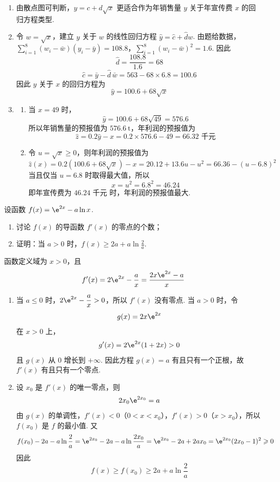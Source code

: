 \begin{solution}
\begin{enumerate}
\item 由散点图可判断，\(y=c+d\sqrt{x}\) 更适合作为年销售量 \(y\) 关于年宣传费 \(x\) 的回归方程类型.

\item 令 \(w=\sqrt{x}\)，建立 \(y\) 关于 \(w\) 的线性回归方程 \(\hat y=\hat c+\hat d w\). 由题给数据，
\(\sum_{i=1}^{8}(w_i-\bar w)(y_i-\bar y)=108.8\)，\(\sum_{i=1}^{8}(w_i-\bar w)^2=1.6\).
因此
\[
\hat d=\frac{108.8}{1.6}=68
\]
\[
\hat c=\bar y-\hat d\,\bar w=563-68\times6.8=100.6
\]
因此 \(y\) 关于 \(x\) 的回归方程为
\[
\hat y=100.6+68\sqrt{x}
\]

\item
\begin{enumerate}
\item 当 \(x=49\) 时，
\[
\hat y=100.6+68\sqrt{49}=576.6
\]
所以年销售量的预报值为 \(576.6\mathrm{~t}\)，年利润的预报值为
\[
\hat z=0.2\hat y-x=0.2\times576.6-49=66.32\text{~千元}
\]

\item 令 \(u=\sqrt{x}\geqslant0\)，则年利润的预报值为
\[
\hat z(x)=0.2(100.6+68\sqrt{x})-x
=20.12+13.6u-u^2
=66.36-(u-6.8)^2
\]
当且仅当 \(u=6.8\) 时取得最大值，所以
\[
x=u^2=6.8^2=46.24
\]
即年宣传费为 \(46.24\text{~千元}\) 时，年利润的预报值最大.
\end{enumerate}
\end{enumerate}
\end{solution}

\begin{problem}
设函数 \(f(x)=\e^{2x}-a\ln x\).

\begin{enumerate}
\item 讨论 \(f(x)\) 的导函数 \(f'(x)\) 的零点的个数；
\item 证明：当 \(a>0\) 时，\(f(x)\geqslant2a+a\ln\frac{2}{a}\).
\end{enumerate}
\end{problem}

\begin{solution}
函数定义域为 \(x>0\)，且
\[
f'(x)=2\e^{2x}-\frac{a}{x}
=\frac{2x\e^{2x}-a}{x}
\]

\begin{enumerate}
\item 当 \(a\leqslant0\) 时，\(2\e^{2x}-\dfrac{a}{x}>0\)，所以 \(f'(x)\) 没有零点. 当 \(a>0\) 时，令
\[
g(x)=2x\e^{2x}
\]
在 \(x>0\) 上，
\[
g'(x)=2\e^{2x}(1+2x)>0
\]
且 \(g(x)\) 从 \(0\) 增长到 \(+\infty\). 因此方程 \(g(x)=a\) 有且只有一个正根，故 \(f'(x)\) 有且只有一个零点.

\item 设 \(x_0\) 是 \(f'(x)\) 的唯一零点，则
\[
2x_0\e^{2x_0}=a
\]
由 \(g(x)\) 的单调性，\(f'(x)<0\)（\(0<x<x_0\)），\(f'(x)>0\)（\(x>x_0\)），所以 \(f(x_0)\) 是 \(f\) 的最小值. 又
\[
f(x_0)-2a-a\ln\frac{2}{a}
=\e^{2x_0}-2a-a\ln\frac{2x_0}{a}
=\e^{2x_0}-2a+2ax_0
=\e^{2x_0}(2x_0-1)^2\geqslant0
\]
因此
\[
f(x)\geqslant f(x_0)\geqslant2a+a\ln\frac{2}{a}
\]
\end{enumerate}
\end{solution}


